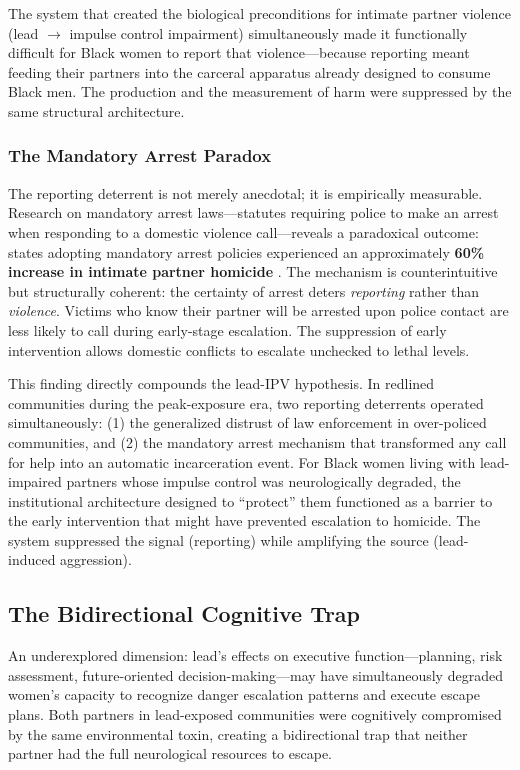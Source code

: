 \documentclass[12pt, letterpaper]{article}
\begin{document}
The system that created the biological preconditions for intimate partner violence (lead $\rightarrow$ impulse control impairment) simultaneously made it functionally difficult for Black women to report that violence---because reporting meant feeding their partners into the carceral apparatus already designed to consume Black men. The production and the measurement of harm were suppressed by the same structural architecture.

\subsubsection{The Mandatory Arrest Paradox}

The reporting deterrent is not merely anecdotal; it is empirically measurable. Research on mandatory arrest laws---statutes requiring police to make an arrest when responding to a domestic violence call---reveals a paradoxical outcome: states adopting mandatory arrest policies experienced an approximately \textbf{60\% increase in intimate partner homicide} \citep{iyengar2009}. The mechanism is counterintuitive but structurally coherent: the certainty of arrest deters \textit{reporting} rather than \textit{violence}. Victims who know their partner will be arrested upon police contact are less likely to call during early-stage escalation. The suppression of early intervention allows domestic conflicts to escalate unchecked to lethal levels.

This finding directly compounds the lead-IPV hypothesis. In redlined communities during the peak-exposure era, two reporting deterrents operated simultaneously: (1) the generalized distrust of law enforcement in over-policed communities, and (2) the mandatory arrest mechanism that transformed any call for help into an automatic incarceration event. For Black women living with lead-impaired partners whose impulse control was neurologically degraded, the institutional architecture designed to ``protect'' them functioned as a barrier to the early intervention that might have prevented escalation to homicide. The system suppressed the signal (reporting) while amplifying the source (lead-induced aggression).

\subsection{The Bidirectional Cognitive Trap}

An underexplored dimension: lead's effects on executive function---planning, risk assessment, future-oriented decision-making---may have simultaneously degraded women's capacity to recognize danger escalation patterns and execute escape plans. Both partners in lead-exposed communities were cognitively compromised by the same environmental toxin, creating a bidirectional trap that neither partner had the full neurological resources to escape.
\end{document}
